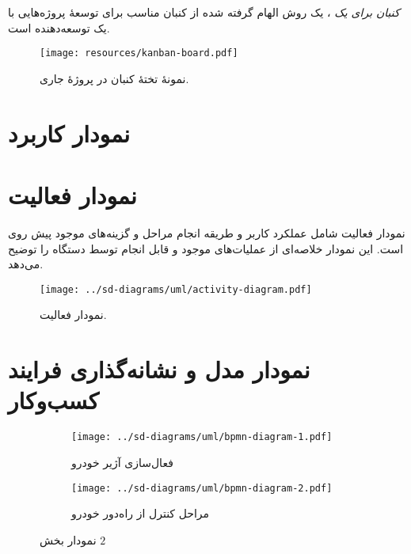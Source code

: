 \documentclass[a4paper,12pt]{report}
\begin{document}
	\emph{
	کنبان برای یک
	}،
	یک روش الهام گرفته شده از کنبان مناسب برای توسعهٔ پروژه‌هایی با یک توسعه‌دهنده است.
	\cite{prsonalkanban:online}
	\begin{figure}[!h]
		\begin{center}
			\texttt{[image: resources/kanban-board.pdf]}
		\end{center}
		\caption{
			نمونهٔ تختهٔ کنبان در پروژهٔ جاری.
		}
		\label{fig3:sec1:chap2}
	\end{figure}

	\section{
		نمودار کاربرد
	}\label{sec3:chap2}

	\section{
		نمودار فعالیت
	}\label{sec4:chap2}
	نمودار فعالیت شامل عملکرد کاربر و طریقه انجام مراحل و گزینه‌های موجود پیش روی است.
	این نمودار خلاصه‌ای از عملیات‌های موجود و قابل انجام توسط دستگاه را توضیح می‌دهد.

	\begin{figure}[!h]
		\begin{center}
			\texttt{[image: ../sd-diagrams/uml/activity-diagram.pdf]}
		\end{center}
		\caption{
		نمودار فعالیت.
		}
		\label{fig4:sec1:chap1}
	\end{figure}

	\pagebreak
	\section{
		نمودار مدل و نشانه‌گذاری فرایند کسب‌وکار
	}\label{sec5:chap2}

%

	\begin{figure}[!ht]
		\centering
		\footnotesize
		\begin{subfigure}[t]{0.47\linewidth}
			\centering
			\texttt{[image: ../sd-diagrams/uml/bpmn-diagram-1.pdf]}
			\caption{
			فعال‌سازی آژیر خودرو
			}
			\label{subfig1:fig5:sec5:chap2}
		\end{subfigure}
		\begin{subfigure}[t]{0.47\linewidth}
			\centering
			\texttt{[image: ../sd-diagrams/uml/bpmn-diagram-2.pdf]}
			\caption{
				مراحل کنترل از راه‌دور  خودرو
			}
			\label{subfig2:fig5:sec5:chap2}
		\end{subfigure}
		\hspace*{1cm}
		\normalsize
		\label{fig5:sec5:chap2}
		\caption{
			نمودار
			بخش
			$2$
		}
	\end{figure}
\end{document}
